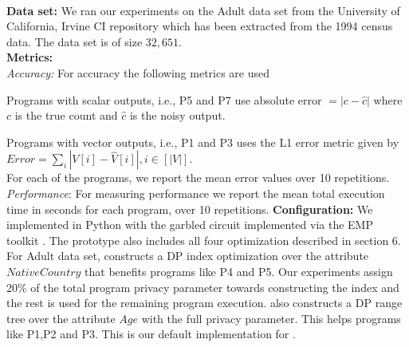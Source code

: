 \\\textbf{Data set:}
We ran our experiments on the Adult data set from the University of California, Irvine CI repository \cite{UCI}  which has been extracted from the 1994 census data. The data set is of size $32,651$.
\\\textbf{Metrics:}
\\\textit{Accuracy:} For accuracy the following metrics are used
\squishlist \item Programs with scalar outputs, i.e.,  P5 and P7 use absolute error $ =|c-\hat{c}|$ where $c$ is the true count and $\hat{c}$ is the noisy output.\item Programs with vector outputs, i.e., P1 and P3 uses the L1 error metric given  by $Error=\sum_{i}|V[i]-\hat{V}[i]|, i \in [|V|]$.\\
For each of the programs, we report the mean error values over 10 repetitions.\squishend
\textit{Performance}: For measuring performance we report the mean total execution time in seconds for each program, over 10 repetitions. \textbf{Configuration:} We implemented \system in Python with the garbled circuit implemented via the EMP
toolkit \cite{EMP}. The prototype also includes all four 
optimization described in section 6.
For Adult data set, \system constructs a DP index optimization over
the attribute $NativeCountry$ that benefits programs like P4 and P5. Our experiments assign
20\% of the total program privacy parameter towards constructing the index
and the rest is used for the remaining program execution. \system also constructs a
DP range tree over the attribute $Age$ with the full privacy parameter. This helps programs like P1,P2 and P3. This is our default implementation for \system. %




